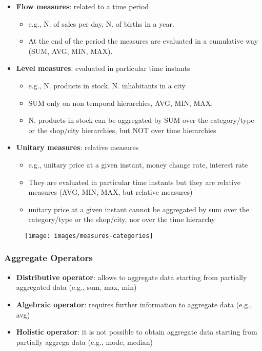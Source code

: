 \documentclass[10pt,a4paper]{article}
\begin{document}
\begin{itemize}
	\item \textbf{Flow measures}: related to a time period 
	\begin{itemize}
		\item e.g., N. of sales per day, N. of births in a year.
		\item  At the end of the period the measures are evaluated in a cumulative way (SUM, AVG, MIN, MAX).
	\end{itemize}
	\item \textbf{Level measures}: evaluated in particular time instants
	\begin{itemize}
		\item e.g., N. products in stock, N. inhabitants in a city
		\item SUM only on non temporal hierarchies, AVG, MIN, MAX.
		\item N. products in stock can be aggregated by SUM over the category/type or the shop/city hierarchies, but NOT over time hierarchies
\end{itemize}
	\item \textbf{Unitary measures}: relative measures 
	\begin{itemize}
		\item e.g., unitary price at a given instant, money change rate, interest rate
		\item They are evaluated in particular time instants but they are relative measures  (AVG, MIN, MAX, but relative measures)
		\item unitary price at a given instant cannot be aggregated by sum over the category/type or the shop/city, nor over the time hierarchy
	\end{itemize}		
\end{itemize}
\begin{figure}[htp]
\center
\texttt{[image: images/measures-categories]}\hfill
\end{figure}
\subsubsection{Aggregate Operators}
\begin{itemize}
	\item \textbf{Distributive operator}: allows to aggregate data starting from partially aggregated data (e.g., sum, max, min)
	\item \textbf{Algebraic operator}: requires further information to aggregate data (e.g., avg)
	\item \textbf{Holistic operator}: it is not possible to obtain aggregate data starting from partially aggrega data (e.g., mode, median)
\end{itemize}
\end{document}
